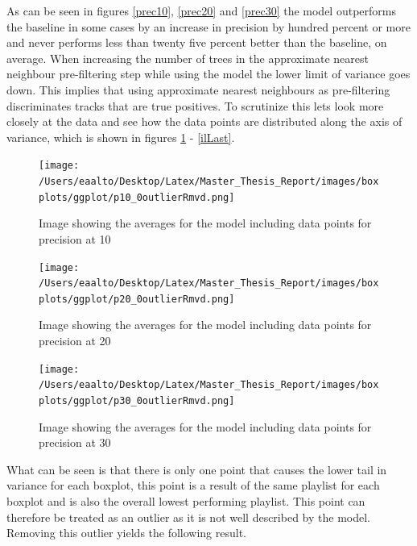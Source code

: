 \documentclass[a4paper,11pt]{kth-mag}
\begin{document}
As can be seen in figures \ref{prec10}, \ref{prec20} and \ref{prec30} the model outperforms the baseline in some cases by an increase in precision by hundred percent or more and never performs less than twenty five percent better than the baseline, on average. 
When increasing the number of trees in the approximate nearest neighbour pre-filtering step while using the model the lower limit of variance goes down. This implies that using approximate nearest neighbours as pre-filtering discriminates tracks that are true positives. To scrutinize this lets look more closely at the data and see how the data points are distributed along the axis of variance, which is shown in figures \ref{ilUno} - \ref{ilLast}.

\begin{figure}
\centering
\texttt{[image: /Users/eaalto/Desktop/Latex/Master\_Thesis\_Report/images/boxplots/ggplot/p10\_0outlierRmvd.png]}

\caption{Image showing the averages for the model including data points for precision at 10}
\label{ilUno}
\end{figure}

\begin{figure}
\centering
\texttt{[image: /Users/eaalto/Desktop/Latex/Master\_Thesis\_Report/images/boxplots/ggplot/p20\_0outlierRmvd.png]}
\caption{Image showing the averages for the model including data points for precision at 20}
\end{figure}


\begin{figure}
\centering
\texttt{[image: /Users/eaalto/Desktop/Latex/Master\_Thesis\_Report/images/boxplots/ggplot/p30\_0outlierRmvd.png]}
\caption{Image showing the averages for the model including data points for precision at 30}
\end{figure}

What can be seen is that there is only one point that causes the lower tail in variance for each boxplot, this point is a result of the same playlist for each boxplot and is also the overall lowest performing playlist. This point can therefore be treated as an outlier as it is not well described by the model. Removing this outlier yields the following result.
\end{document}
